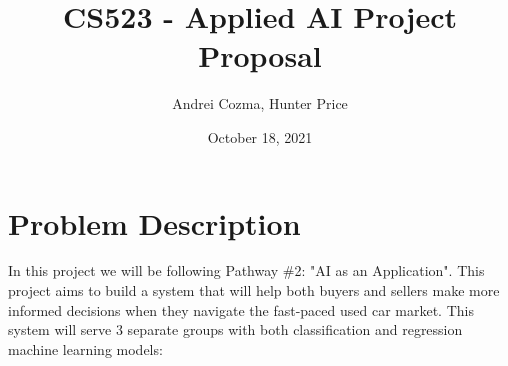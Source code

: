 \documentclass[12pt]{article}
\begin{document}
\title{CS523 - Applied AI Project Proposal}
\author{Andrei Cozma, Hunter Price}
\date{October 18, 2021}

\maketitle


\section{Problem Description}

In this project we will be following Pathway \#2: "AI as an Application".
This project aims to build a system that will help both buyers and sellers make more informed decisions when they navigate the fast-paced used car market. This system will serve 3 separate groups with both classification and regression machine learning models:

\end{document}
